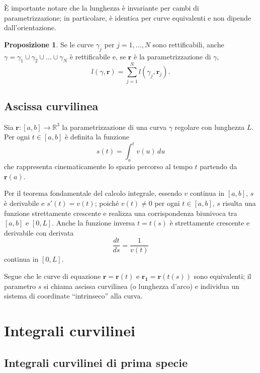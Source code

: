 \documentclass[a4paper]{book}
\numberwithin{equation}{section}
\theoremstyle{plain}
\theoremstyle{definition}
\newtheorem{prop}{Proposizione}[section]
\theoremstyle{remark}
\renewcommand{\vec}{\boldsymbol}
\theoremstyle{example}
\begin{document}
È importante notare che la lunghezza è invariante per cambi di parametrizzazione; in particolare, è identica per curve equivalenti e non dipende dall'orientazione.

\begin{prop}
	Se le curve $\gamma_j$ per $j = 1, \dots, N$ sono rettificabili, anche $\gamma = \gamma_1 \cup \gamma_2 \cup \dots \cup \gamma_N$ è rettificabile e, se $\vec{r}$ è la parametrizzazione di $\gamma$,
	\begin{equation}
		l(\gamma, \vec{r}) = \sum_{j=1}^N l(\gamma_j, \vec{r}_j).
	\end{equation}
\end{prop}

\subsection{Ascissa curvilinea}

Sia $\vec{r} \colon \! [a, b] \to \mathbb{R}^3$ la parametrizzazione di una curva $\gamma$ regolare con lunghezza $L$. Per ogni $t \in [a, b]$ è definita la funzione
\begin{equation*}
	s(t) = \int_a^t v(u)\, du
\end{equation*}
che rappresenta cinematicamente lo spazio percorso al tempo $t$ partendo da $\vec{r}(a)$.

Per il teorema fondamentale del calcolo integrale, essendo $v$ continua in $[a, b]$, $s$ è derivabile e $s'(t) = v(t)$; poiché $v(t) \ne 0$ per ogni $t \in [a, b]$, $s$ risulta una funzione strettamente crescente e realizza una corrispondenza biunivoca tra $[a, b]$ e $[0, L]$. Anche la funzione inversa $t = t(s)$ è strettamente crescente e derivabile con derivata
\begin{equation*}
	\frac{dt}{ds} = \frac{1}{v(t)}
\end{equation*}
continua in $[0, L]$.

Segue che le curve di equazione $\vec{r} = \vec{r}(t)$ e $\vec{r_1} = \vec{r}(t(s))$ sono equivalenti; il parametro $s$ si chiama ascissa curvilinea (o lunghezza d'arco) e individua un sistema di coordinate ``intrinseco'' alla curva.

\section{Integrali curvilinei}
\subsection{Integrali curvilinei di prima specie}
\end{document}
